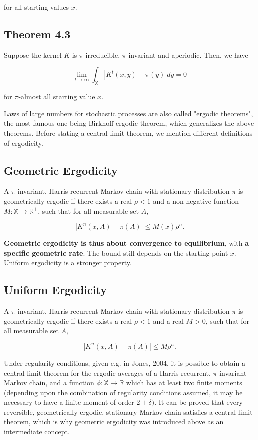 \documentclass[10pt]{article}
\begin{document}
for all starting values $x$.

\subsection{Theorem 4.3}
 Suppose the kernel $K$ is $\pi$-irreducible, $\pi$-invariant and aperiodic. Then, we have

$$
\lim _{t \rightarrow \infty} \int_{\mathbb{X}}\left|K^{t}(x, y)-\pi(y)\right| d y=0
$$

for $\pi$-almost all starting value $x$.

Laws of large numbers for stochastic processes are also called "ergodic theorems", the most famous one being Birkhoff ergodic theorem, which generalizes the above theorems. Before stating a central limit theorem, we mention different definitions of ergodicity.

\subsection{Geometric Ergodicity}
A $\pi$-invariant, Harris recurrent Markov chain with stationary distribution $\pi$ is geometrically ergodic if there exists a real $\rho<1$ and a non-negative function $M: \mathbb{X} \rightarrow \mathbb{R}^{+}$, such that for all measurable set $A$,

$$
\left|K^{n}(x, A)-\pi(A)\right| \leq M(x) \rho^{n} .
$$

\textbf{Geometric ergodicity is thus about convergence to equilibrium}, with \textbf{a specific geometric rate}. The bound still depends on the starting point $x$. Uniform ergodicity is a stronger property.

\subsection{Uniform Ergodicity}
 A $\pi$-invariant, Harris recurrent Markov chain with stationary distribution $\pi$ is geometrically ergodic if there exists a real $\rho<1$ and a real $M>0$, such that for all measurable set $A$,

$$
\left|K^{n}(x, A)-\pi(A)\right| \leq M \rho^{n} .
$$

Under regularity conditions, given e.g. in Jones, 2004, it is possible to obtain a central limit theorem for the ergodic averages of a Harris recurrent, $\pi$-invariant Markov chain, and a function $\phi: \mathbb{X} \rightarrow \mathbb{R}$ which has at least two finite moments (depending upon the combination of regularity conditions assumed, it may be necessary to have a finite moment of order $2+\delta)$. It can be proved that every reversible, geometrically ergodic, stationary Markov chain satisfies a central limit theorem, which is why geometric ergodicity was introduced above as an intermediate concept.
\end{document}
